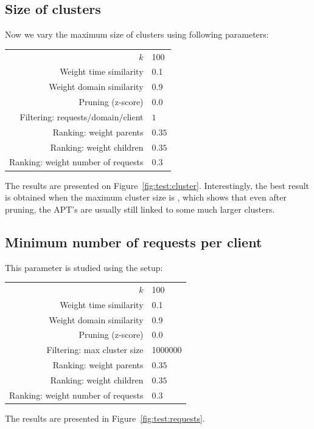 \documentclass[conference]{IEEEtran}
\begin{document}
\subsection{Size of clusters}

Now we vary the maximum size of clusters using following parameters:

{\small
\begin{tabularx}{\linewidth}{rl}
\hline
$k$ & 100 \\
Weight time similarity & 0.1 \\ 
Weight domain similarity & 0.9 \\
Pruning (z-score) & 0.0 \\
Filtering: requests/domain/client & $1$ \\ 
Ranking: weight parents & $0.35$ \\ 
Ranking: weight children & $0.35$ \\ 
Ranking: weight number of requests & $0.3$ \\
\hline
\end{tabularx}
}

The results are presented on Figure~\ref{fig:test:cluster}. Interestingly, the best result is obtained when the maximum cluster size is , which shows that even after pruning, the APT's are usually still linked to some much larger clusters. 

\subsection{Minimum number of requests per client}

This parameter is studied using the setup:

{\small
\begin{tabularx}{\linewidth}{rl}
\hline
$k$ & 100 \\
Weight time similarity & 0.1 \\ 
Weight domain similarity & 0.9 \\
Pruning (z-score) & 0.0 \\
Filtering: max cluster size & 1000000 \\
Ranking: weight parents & $0.35$ \\ 
Ranking: weight children & $0.35$ \\ 
Ranking: weight number of requests & $0.3$ \\
\hline
\end{tabularx}
}

The results are presented in Figure~\ref{fig:test:requests}.
\end{document}
